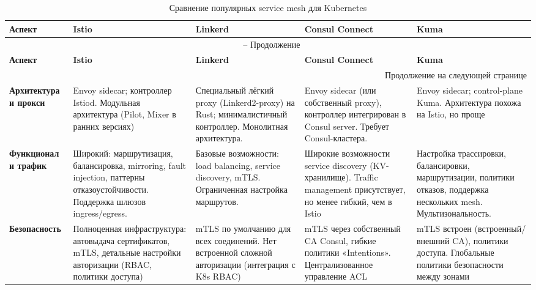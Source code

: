 \begingroup
\small
\setlength{\tabcolsep}{4pt} %
\begin{longtable}{|p{2.6cm}|p{3.3cm}|p{3.3cm}|p{3.3cm}|p{3.3cm}|}
\caption{Сравнение популярных service mesh для Kubernetes} \label{tab:meshes} \\
\hline
\textbf{Аспект} & \textbf{Istio} & \textbf{Linkerd} & \textbf{Consul Connect} & \textbf{Kuma} \\
\hline
\endfirsthead

\multicolumn{5}{c}{\tablename\ \thetable{} -- Продолжение} \\
\hline
\textbf{Аспект} & \textbf{Istio} & \textbf{Linkerd} & \textbf{Consul Connect} & \textbf{Kuma} \\
\hline
\endhead

\hline \multicolumn{5}{r}{{Продолжение на следующей странице}} \\
\endfoot

\hline
\endlastfoot

\textbf{Архитектура и прокси} & 
Envoy sidecar; контроллер Istiod. Модульная архитектура (Pilot, Mixer в ранних версиях) & 
Специальный лёгкий proxy (Linkerd2-proxy) на Rust; минималистичный контроллер. Монолитная архитектура. & 
Envoy sidecar (или собственный proxy), контроллер интегрирован в Consul server. Требует Consul-кластера. & 
Envoy sidecar; control-plane Kuma. Архитектура похожа на Istio, но проще \\
\hline

\textbf{Функционал и трафик} & 
Широкий: маршрутизация, балансировка, mirroring, fault injection, паттерны отказоустойчивости. Поддержка шлюзов ingress/egress. & 
Базовые возможности: load balancing, service discovery, mTLS. Ограниченная настройка маршрутов. & 
Широкие возможности service discovery (KV-хранилище). Traffic management присутствует, но менее гибкий, чем в Istio & 
Настройка трассировки, балансировки, маршрутизации, политики отказов, поддержка нескольких mesh. Мультизональность. \\
\hline

\textbf{Безопасность} & 
Полноценная инфраструктура: автовыдача сертификатов, mTLS, детальные настройки авторизации (RBAC, политики доступа) & 
mTLS по умолчанию для всех соединений. Нет встроенной сложной авторизации (интеграция с K8s RBAC) & 
mTLS через собственный CA Consul, гибкие политики «Intentions». Централизованное управление ACL & 
mTLS встроен (встроенный/внешний CA), политики доступа. Глобальные политики безопасности между зонами \\
\hline


\end{longtable}
